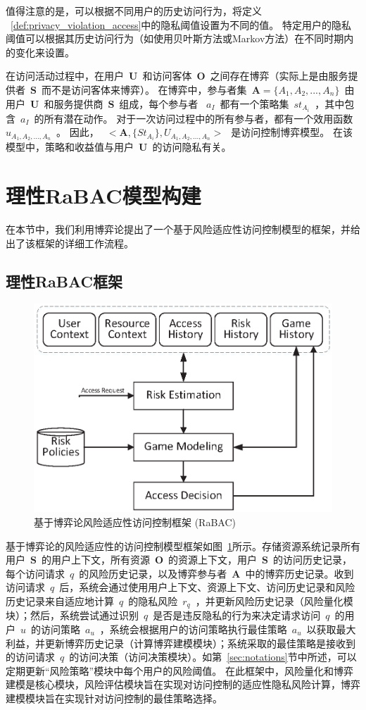 值得注意的是，可以根据不同用户的历史访问行为，将定义 ~\ref{def:privacy_violation_access}中的隐私阈值设置为不同的值。 特定用户的隐私阈值可以根据其历史访问行为（如使用贝叶斯方法或Markov方法）在不同时期内的变化来设置。

在访问活动过程中，在用户~$\mathbf{U}$~和访问客体~$\mathbf{O}$~之间存在博弈（实际上是由服务提供者~$\mathbf{S}$~而不是访问客体来博弈）。 在博弈中，参与者集~$\mathbf{A}=\{A_1,A_2,...,A_n\}$~由用户~$\mathbf{U}$~和服务提供商~$\mathbf{S}$~组成，每个参与者 ~$a_I$~都有一个策略集~$st_{A_i}$~，其中包含~$a_I$~的所有潜在动作。 对于一次访问过程中的所有参与者，都有一个效用函数~$u_{A_1,A_2,...,A_n}$~。 因此，~$~<\mathbf{A},\{St_{A_i}\},U_{A_1,A_2,...,A_n}>~$~是访问控制博弈模型。 在该模型中，策略和收益值与用户~$\mathbf{U}$~的访问隐私有关。

\section{理性RaBAC模型构建}
\label{sec:framework}


在本节中，我们利用博弈论提出了一个基于风险适应性访问控制模型的框架，并给出了该框架的详细工作流程。
\subsection{理性RaBAC框架}
\label{sec:hlframework}
\begin{figure}[htb]
	\centering
	\includegraphics[width=.65\textwidth]{./figures/game-rbac-framework.eps}
	\caption{基于博弈论风险适应性访问控制框架 (RaBAC)}\label{fig:game-rbac-framework}
\end{figure}

基于博弈论的风险适应性的访问控制模型框架如图~\ref{fig:game-rbac-framework}所示。存储资源系统记录所有用户~$\mathbf{S}$~的用户上下文，所有资源~$\mathbf{O}$~的资源上下文，用户~$\mathbf{S}$~的访问历史记录，每个访问请求~$q$~的风险历史记录，以及博弈参与者~$\mathbf{A}$~中的博弈历史记录。收到访问请求~$q$~后，系统会通过使用用户上下文、资源上下文、访问历史记录和风险历史记录来自适应地计算~$q$~的隐私风险~$r_q$~，并更新风险历史记录（风险量化模块）；然后，系统尝试通过识别~$q$~是否是违反隐私的行为来决定请求访问~$q$~的用户~$u$~的访问策略~$a_u$~，系统会根据用户的访问策略执行最佳策略~$a_u$~以获取最大利益，并更新博弈历史记录（计算博弈建模模块）；系统采取的最佳策略是接收到的访问请求~$q$~的访问决策（访问决策模块）。如第~\ref{sec:notations}节中所述，可以定期更新“风险策略”模块中每个用户的风险阈值。
在此框架中，风险量化和博弈建模是核心模块，风险评估模块旨在实现对访问控制的适应性隐私风险计算，博弈建模模块旨在实现针对访问控制的最佳策略选择。


